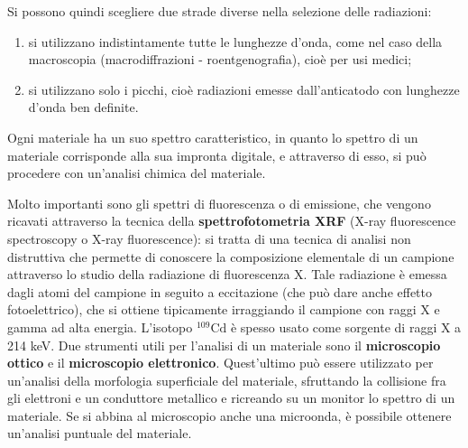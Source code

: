 Si possono quindi scegliere due strade diverse nella selezione delle radiazioni:
\begin{enumerate}
    \item si utilizzano indistintamente tutte le lunghezze d’onda, come nel caso della macroscopia (macrodiffrazioni - roentgenografia), cioè per usi medici;
    \item si utilizzano solo i picchi, cioè radiazioni emesse dall’anticatodo con lunghezze d’onda ben definite.
\end{enumerate}

Ogni materiale ha un suo spettro caratteristico, in quanto lo spettro di un materiale corrisponde alla sua impronta digitale, e attraverso di esso, si può procedere con un’analisi chimica del materiale.

Molto importanti sono gli spettri di fluorescenza o di emissione, che vengono ricavati attraverso la tecnica della \textbf{spettrofotometria XRF} (X-ray fluorescence spectroscopy o X-ray fluorescence): si tratta di una tecnica di analisi non distruttiva che permette di conoscere la composizione elementale di un campione attraverso lo studio della radiazione di fluorescenza X. Tale radiazione è emessa dagli atomi del campione in seguito a eccitazione (che può dare anche effetto fotoelettrico), che si ottiene tipicamente irraggiando il campione con raggi X e gamma ad alta energia.
L’isotopo $\mathrm{^{109}\mathrm{Cd}}$ è spesso usato come sorgente di raggi X a 214 keV.
Due strumenti utili per l’analisi di un materiale sono il \textbf{microscopio ottico} e il \textbf{microscopio elettronico}. Quest’ultimo può essere utilizzato per un’analisi della morfologia superficiale del materiale, sfruttando la collisione fra gli elettroni e un conduttore metallico e ricreando su un monitor lo spettro di un materiale. Se si abbina al microscopio anche una microonda, è possibile ottenere un’analisi puntuale del materiale.

